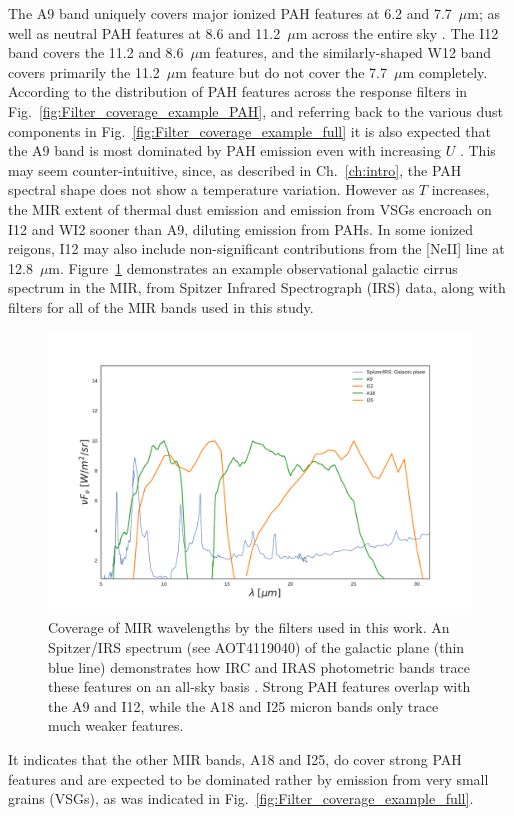          The A9 band uniquely covers major ionized PAH features at 6.2 and 7.7~$\mu$m; as well as neutral PAH features at 8.6 and 11.2~$\mu$m across the entire sky \citep{irc07}. The I12 band covers the 11.2 and 8.6~$\mu$m features, and the similarly-shaped W12 band covers primarily the 11.2~$\mu{}$m feature but do not cover the 7.7~$\mu{}$m completely. According to the distribution of PAH features across the response filters in Fig.~\ref{fig:Filter_coverage_example_PAH}, and referring back to the various dust components in Fig.~\ref{fig:Filter_coverage_example_full} it is also expected that the A9 band is most dominated by PAH emission even with increasing $U$ . This may seem counter-intuitive, since, as described in Ch.~\ref{ch:intro}, the PAH spectral shape does not show a temperature variation. However as $T$ increases, the MIR extent of thermal dust emission and emission from VSGs encroach on I12 and WI2 sooner than A9, diluting emission from PAHs. In some ionized reigons, I12 may also include non-significant contributions from the [NeII] line at 12.8~$\mu$m. Figure~\ref{fig:Filter_coverage_example_MIR} demonstrates an example observational galactic cirrus spectrum in the MIR, from Spitzer Infrared Spectrograph (IRS) \citep{spitzer04} data, along with filters for all of the MIR bands used in this study.
             \begin{figure}
               \centering
               \includegraphics[width=\textwidth]{../Plots/ch_datasources/Filter_coverage_example_MIR.pdf}
               \caption{Coverage of MIR wavelengths by the filters used in this work. An Spitzer/IRS spectrum (see AOT4119040) of the galactic plane (thin blue line) demonstrates how IRC and IRAS photometric bands trace these features on an all-sky basis \citep{ishihara07}. Strong PAH features overlap with the A9 and I12, while the A18 and I25 micron bands only trace much weaker features. }
               \label{fig:Filter_coverage_example_MIR}
             \end{figure}
         It indicates that the other MIR bands, A18 and I25, do cover strong PAH features and are expected to be dominated rather by emission from very small grains (VSGs), as was indicated in Fig.~\ref{fig:Filter_coverage_example_full}.

